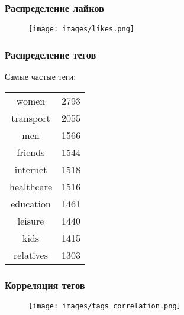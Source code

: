 \documentclass[14pt]{beamer}
\begin{document}
\begin{frame}[fragile]
	
	\frametitle{Распределение лайков}
	
	\begin{figure}
		\texttt{[image: images/likes.png]}
	\end{figure}
	
\end{frame}

\begin{frame}[fragile]
	
	\frametitle{Распределение тегов}
	
	\begin{center}
		Самые частые теги:
		
		\begin{tabular}{c|c}
			women & 2793 \\
			transport & 2055 \\
			\colorbox{blue!30}{men} & 1566 \\
			friends & 1544 \\
			internet & 1518 \\
			healthcare & 1516 \\
			education & 1461 \\
			leisure & 1440 \\
			\colorbox{blue!30}{kids} & 1415 \\
			\colorbox{blue!30}{relatives} & 1303 \\
		\end{tabular}
	\end{center}
	
\end{frame}

\begin{frame}[fragile]
	
	\frametitle{Корреляция тегов}
	
	\begin{figure}
		\texttt{[image: images/tags\_correlation.png]}
	\end{figure}
	
\end{frame}
\end{document}
